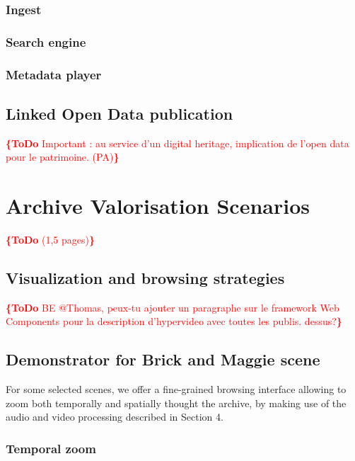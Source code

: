 \documentclass[conference]{IEEEtran}
\newcommand{\todo}[1]{\noindent\textcolor{red}{{\bf \{ToDo} #1{\bf \}}}}
\begin{document}
\subsubsection{Ingest}

\subsubsection{Search engine}

\subsubsection{Metadata player}

\subsection{Linked Open Data  publication}
\todo{Important : au service d'un digital heritage, implication de l'open data pour le patrimoine. (PA)}


\section{Archive Valorisation Scenarios}
\todo{(1,5 pages)}

\subsection{Visualization and browsing strategies}
\todo{BE @Thomas, peux-tu ajouter un paragraphe sur le framework Web Components pour la description d'hypervideo avec toutes les publis. dessus?}

\subsection{Demonstrator for Brick and Maggie scene}
For some selected scenes, we offer a fine-grained browsing interface allowing to zoom both temporally and spatially
thought the archive, by making use of the audio and video processing described in Section 4.  

\subsubsection{Temporal zoom}
\end{document}
